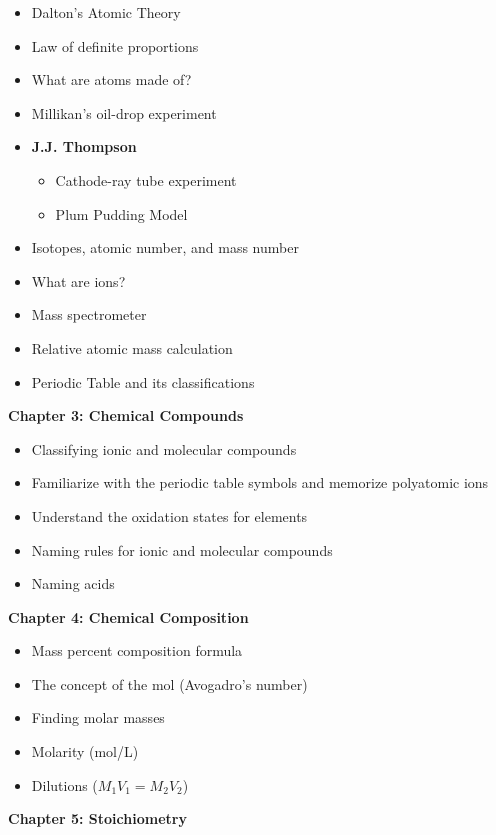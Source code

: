 \documentclass[12pt]{article}
\begin{document}
\begin{itemize}
  \setlength\itemsep{0em}
\item Dalton's Atomic Theory
\item Law of definite proportions
\item What are atoms made of?
\item Millikan's oil-drop experiment
\item[] \textbf{J.J. Thompson}
  \begin{itemize}
  \item Cathode-ray tube experiment
  \item Plum Pudding Model
  \end{itemize}
\item Isotopes, atomic number, and mass number
\item What are ions?
\item Mass spectrometer
\item Relative atomic mass calculation
\item Periodic Table and its classifications
\end{itemize}

\textbf{Chapter 3: Chemical Compounds}

\begin{itemize}
  \setlength\itemsep{0em}
\item Classifying ionic and molecular compounds
\item Familiarize with the periodic table symbols
  and memorize polyatomic ions
\item Understand the oxidation states for elements
\item Naming rules for ionic and molecular compounds
\item Naming acids
\end{itemize}

\textbf{Chapter 4: Chemical Composition}

\begin{itemize}
  \setlength\itemsep{0em}
\item Mass percent composition formula
\item The concept of the mol (Avogadro's number)
\item Finding molar masses
\item Molarity (mol/L)
\item Dilutions ($M_1V_1 = M_2V_2$)
\end{itemize}

\textbf{Chapter 5: Stoichiometry}
\end{document}
